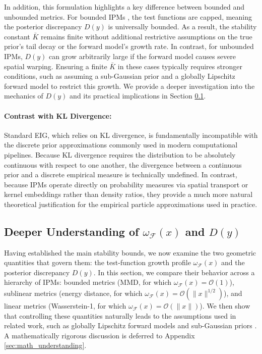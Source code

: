 \documentclass[twoside,11pt]{article}
\def\gF{{\mathcal{F}}}
\begin{document}
In addition, this formulation highlights a key difference between bounded and unbounded metrics. For bounded IPMs , the test functions are capped, meaning the posterior discrepancy $D(y)$ is universally bounded. As a result, the stability constant $\bar{K}$ remains finite without additional restrictive assumptions on the true prior's tail decay or the forward model's growth rate. In contrast, for unbounded IPMs, $D(y)$ can grow arbitrarily large if the forward model causes severe spatial warping. Ensuring a finite $\bar{K}$ in these cases typically requires stronger conditions, such as assuming a sub-Gaussian prior and a globally Lipschitz forward model to restrict this growth. We provide a deeper investigation into the mechanics of $D(y)$ and its practical implications in Section \ref{sec:understanding}.

\paragraph{Contrast with KL Divergence:} Standard EIG, which relies on KL divergence, is fundamentally incompatible with the discrete prior approximations commonly used in modern computational pipelines. Because KL divergence requires the distribution to be absolutely continuous with respect to one another, the divergence between a continuous prior and a discrete empirical measure is technically undefined. In contrast, because IPMs operate directly on probability measures via spatial transport or kernel embeddings rather than density ratios, they provide a much more natural theoretical justification for the empirical particle approximations used in practice.

\subsection{Deeper Understanding of $\omega_{\gF}(x)$ and $D(y)$}
\label{sec:understanding}
Having established the main stability bounds, we now examine the two geometric quantities that govern them: the test-function growth profile $\omega_{\mathcal{F}}(x)$ and the posterior discrepancy $D(y)$. In this section, we compare their behavior across a hierarchy of IPMs: bounded metrics (MMD, for which $\omega_{\mathcal{F}}(x)=\mathcal{O}(1)$), sublinear metrics (energy distance, for which $\omega_{\mathcal{F}}(x)=\mathcal{O}(\|x\|^{1/2})$), and linear metrics (Wasserstein-1, for which $\omega_{\mathcal{F}}(x)=\mathcal{O}(\|x\|)$). We then show that controlling these quantities naturally leads to the assumptions used in related work, such as globally Lipschitz forward models and sub-Gaussian priors \citep{helin2025bayesian}. A mathematically rigorous discussion is deferred to Appendix \ref{sec:math_understanding}.
\end{document}
